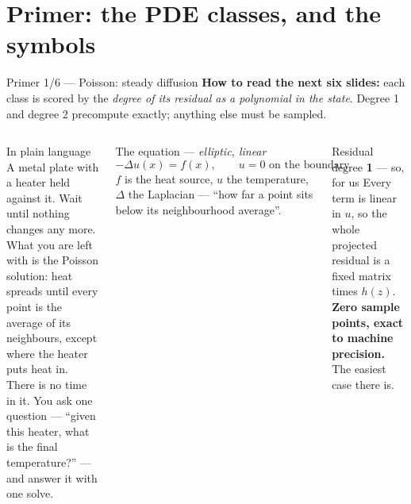 \documentclass[10pt,aspectratio=169]{beamer}
\begin{document}
\section{Primer: the PDE classes, and the symbols}

\begin{frame}{Primer 1/6 --- Poisson: steady diffusion}
  \footnotesize
  \textbf{How to read the next six slides:} each class is scored by the \emph{degree of its residual
  as a polynomial in the state}. Degree 1 and degree 2 precompute exactly; anything else must be sampled.
  \vspace{1mm}
  \begin{columns}[T]
    \begin{block}{In plain language}
      A metal plate with a heater held against it. Wait until nothing changes any more. What you are
      left with is the Poisson solution: heat spreads until every point is the average of its
      neighbours, except where the heater puts heat in.\\[3pt]
      There is no time in it. You ask one question --- ``given this heater, what is the final
      temperature?'' --- and answer it with one solve.
    \end{block}
    \begin{block}{The equation --- \emph{elliptic, linear}}
      \[ -\Delta u(x) = f(x),\qquad u = 0 \text{ on the boundary} \]
      $f$ is the heat source, $u$ the temperature, $\Delta$ the Laplacian --- ``how far a point sits
      below its neighbourhood average''.
    \end{block}
    \begin{exampleblock}{Residual degree \textbf{1} --- so, for us}
      Every term is linear in $u$, so the whole projected residual is a fixed matrix times $h(z)$.
      \textbf{Zero sample points, exact to machine precision.} The easiest case there is.
    \end{exampleblock}
  \end{columns}
\end{frame}
\end{document}
